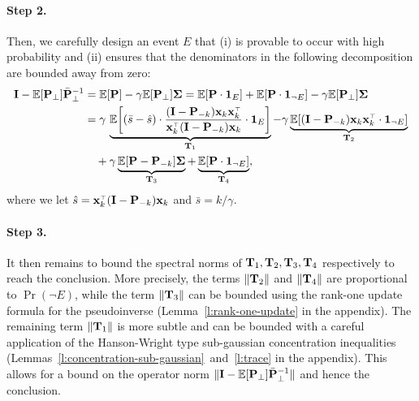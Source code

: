 \documentclass[thesis.tex]{subfiles}
\begin{document}
 \paragraph{Step 2.} Then, we carefully design an event $E$ that (i)
 is provable to occur with high probability and (ii) ensures that the
 denominators in the following decomposition are bounded away from
 zero:
  \begin{align*}
  \I-\E[\P_\perp]\bar\P_\perp^{-1}
    &= \E[\P] - \gamma\E[\P_\perp]\Sigmab = \E[\P \cdot \one_E] +
    \E[\P  \cdot \one_{\neg E}]
    -\gamma\E[\P_\perp]\Sigmab\\
  &=\gamma\,\underbrace{\E\bigg[(\bar s-\hat
    s)\cdot\frac{(\I -\P_{-k})\x_k\x_k^\top}{\x_k^\top(\I -\P_{-k})\x_k} \cdot \one_E\bigg]}_{\T_1}
    - \gamma \underbrace{\E[ (\I - \P_{-k}) \x_k\x_k^\top \cdot \one_{\neg E}]}_{\T_2} \\ 
    &\quad+ \gamma \underbrace{\E[\P-\P_{-k}]\Sigmab}_{\T_3} + \underbrace{\E[\P \cdot \one_{\neg E}]}_{\T_4},
\end{align*}
where we let $\hat s = \x_k^\top(\I - \P_{-k})\x_k$ and $\bar s=k/\gamma$. 
\paragraph{Step 3.}
It then remains to bound the spectral norms of $ \mathbf{T}_1, \mathbf{T}_2, \mathbf{T}_3
,\mathbf{T}_4$ respectively to reach the conclusion. More precisely, the terms
$\| \mathbf{T}_2 \| $ and $\| \mathbf{T}_4 \|$ are proportional to $\Pr (\neg E)$,
while the term $\| \mathbf{T}_3 \|$ can be bounded using the rank-one update
formula for the pseudoinverse (Lemma~\ref{l:rank-one-update} in the
appendix). The remaining term $\| \mathbf{T}_1 \|$ is more subtle and can be
bounded with a careful application of  the Hanson-Wright type
\cite{rudelson2013hanson} sub-gaussian concentration 
inequalities (Lemmas~\ref{l:concentration-sub-gaussian}~and~\ref{l:trace} in the
appendix). This allows for a bound on the operator norm $\| \mathbf I -
\mathbb E[\mathbf P_\perp ] \bar {\mathbf P}_\perp^{-1}\| $ and hence the conclusion. 
\end{document}

